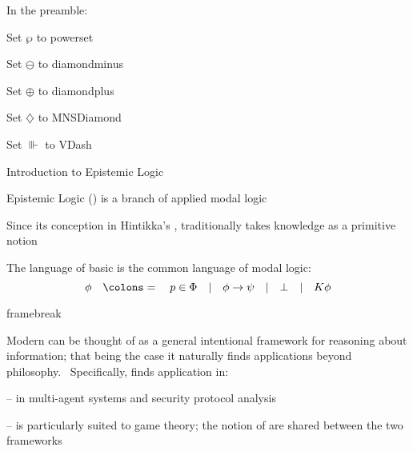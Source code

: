

% 

In the preamble:

Set $\wp$ to powerset

Set $\ominus$ to diamondminus

Set $\oplus$ to diamondplus

Set $\diamondsuit$ to MNSDiamond

Set $\Vvdash$ to VDash


Introduction to Epistemic Logic
\begin{itemizedot}
  \item Epistemic Logic () is a branch of applied modal logic
  
  \item Since its conception in Hintikka's ,  traditionally takes
  knowledge as a primitive notion
  
  \item The language of basic  is the common language of modal
  logic:
  \[ \phi \hspace{1em} \colons = \hspace{1em} p \in \Phi \hspace{1em} |
     \hspace{1em} \phi \rightarrow \psi \hspace{1em} | \hspace{1em} \bot
     \hspace{1em} | \hspace{1em} K \phi \]
\end{itemizedot}
framebreak
\begin{itemizedot}
  \item Modern  can be thought of as a general intentional
  framework for reasoning about information; that being the case it naturally
  finds applications beyond philosophy. \ Specifically,  finds
  application in:
  \begin{itemizedot}
    \item {} -- in multi-agent systems and security
    protocol analysis
    
    \item {} --  is particularly suited to game
    theory; the notion of {} are shared between the
    two frameworks
  \end{itemizedot}
\end{itemizedot}
